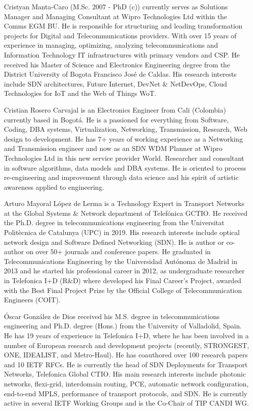 \documentclass[a4paper,fleqn]{cas-dc}
\begin{document}
Cristyan Manta-Caro (M.Sc. 2007 - PhD (c)) currently serves as Solutions Manager and Managing Consultant at Wipro Technologies Ltd within the Comms EGM BU. He is responsible for structuring and leading transformation projects for Digital and Telecommunications providers. With over 15 years of experience in managing, optimizing, analyzing telecommunications and Information Technology IT infrastructures with primary vendors and CSP. He received his Master of Science and Electronics Engineering degree from the District University of Bogota Francisco Jos\'e de Caldas. His research interests include SDN architectures, Future Internet, DevNet \& NetDevOps, Cloud Technologies for IoT and the Web of Things WoT.
\endbio

Cristian Rosero Carvajal is an Electronics Engineer from Cali (Colombia) currently based in Bogotá. He is a passioned for everything from Software, Coding, DBA systems, Virtualization, Networking, Transmission, Research, Web design to development. He has 7+ years of working experience as a Networking and Transmission engineer and now as an SDN WDM Planner at Wipro Technologies Ltd in this new service provider World. Researcher and consultant in software algorithms, data models and DBA systems. He is oriented to process re-engineering and improvement through data science and his spirit of artistic awareness applied to engineering.
\endbio

Arturo Mayoral López de Lerma is a Technology Expert in Transport Networks at the Global Systems \& Network department of Telefónica GCTIO. He received the Ph.D. degree in telecommunications engineering from the Universitat Politècnica de Catalunya (UPC) in 2019. His  research  interests  include  optical network design and Software Defined Networking (SDN). He is author or co-author on over 50+ journals and conference papers.
He graduated in Telecommunications Engineering by the Universidad Autónoma de Madrid in 2013 and he started his professional career in 2012, as undergraduate researcher in Telefonica I+D (R\&D) where developed his Final Career’s Project, awarded with the Best Final Project Prize by the Official College of Telecommunication Engineers (COIT).
\endbio

Óscar González de Dios received his M.S. degree in telecommunications engineering and Ph.D. degree (Hons.) from the University of Valladolid, Spain. He has 19 years of experience in Telefonica I+D, where he has been involved in a number of European research and development projects (recently, STRONGEST, ONE, IDEALIST, and Metro-Haul). He has coauthored over 100 research papers and 10 IETF RFCs. He is currently the head of SDN Deployments for Transport Networks, Telefonica Global CTIO. His main research interests include photonic networks, flexi-grid, interdomain routing, PCE, automatic network configuration, end-to-end MPLS, performance of transport protocols, and SDN. He is currently active in several IETF Working Groups and is the Co-Chair of TIP CANDI WG.
\endbio
\end{document}
